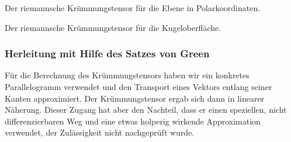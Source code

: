 \begin{beispiel}
Der riemannsche Krümmungstensor für die Ebene in Polarkoordinaten.
\end{beispiel}

\begin{beispiel}
Der riemannsche Krümmungstensor für die Kugeloberfläche.
\end{beispiel}

\subsubsection{Herleitung mit Hilfe des Satzes von Green}
Für die Berechnung des Krümmungstensors haben wir ein konkretes
Parallelogramm verwendet und den Transport eines Vektors entlang
seiner Kanten approximiert.
Der Krümmungstensor ergab sich dann in linearer Näherung.
Dieser Zugang hat aber den Nachteil, dass er einen speziellen, nicht
differenzierbaren Weg und eine etwas holperig wirkende Approximation
verwendet, der Zulässigkeit nicht nachgeprüft wurde.

